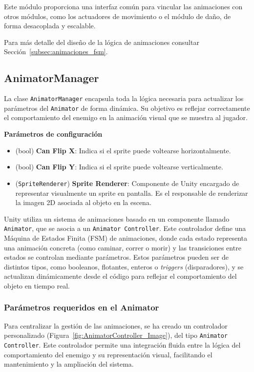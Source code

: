 Este módulo proporciona una interfaz común para vincular las animaciones con otros módulos, como los actuadores de movimiento o el módulo de daño, de forma desacoplada y escalable.

Para más detalle del diseño de la lógica de animaciones consultar Sección~\ref{subsec:animaciones_fsm}.

\subsection{AnimatorManager}

La clase \texttt{AnimatorManager} encapsula toda la lógica necesaria para actualizar los parámetros del \texttt{Animator} de forma dinámica. Su objetivo es reflejar correctamente el comportamiento del enemigo en la animación visual que se muestra al jugador.

\textbf{Parámetros de configuración}
\begin{itemize}
	\item (bool) \textbf{Can Flip X}: Indica si el sprite puede voltearse horizontalmente.
	\item (bool) \textbf{Can Flip Y}: Indica si el sprite puede voltearse verticalmente. 
	\item (\texttt{SpriteRenderer}) \textbf{Sprite Renderer}: Componente de Unity encargado de representar visualmente un sprite en pantalla. Es el responsable de renderizar la imagen 2D asociada al objeto en la escena.

\end{itemize}

Unity utiliza un sistema de animaciones basado en un componente llamado \texttt{Animator}, que se asocia a un \texttt{Animator Controller}. Este controlador define una Máquina de Estados Finita (FSM) de animaciones, donde cada estado representa una animación concreta (como caminar, correr o morir) y las transiciones entre estados se controlan mediante parámetros. Estos parámetros pueden ser de distintos tipos, como booleanos, flotantes, enteros o \textit{triggers} (disparadores), y se actualizan dinámicamente desde el código para reflejar el comportamiento del objeto en tiempo real.\\

\subsubsection{Parámetros requeridos en el Animator}

Para centralizar la gestión de las animaciones, se ha creado un controlador personalizado (Figura~\ref{fig:AnimatorController_Image}), del tipo \texttt{Animator Controller}. Este controlador permite una integración fluida entre la lógica del comportamiento del enemigo y su representación visual, facilitando el mantenimiento y la ampliación del sistema.\\

